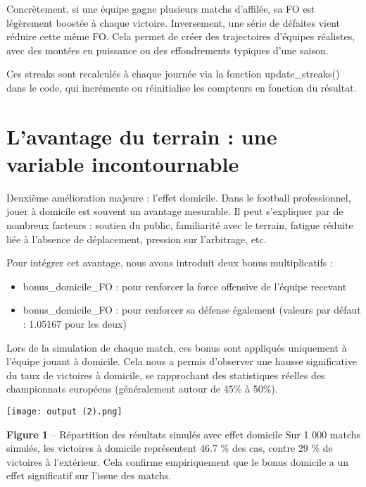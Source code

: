 \documentclass[12pt]{report}
\begin{document}
Concrètement, si une équipe gagne plusieurs matchs d’affilée, sa FO est légèrement boostée à chaque victoire. Inversement, une série de défaites vient réduire cette même FO. Cela permet de créer des trajectoires d’équipes réalistes, avec des montées en puissance ou des effondrements typiques d’une saison.

Ces streaks sont recalculés à chaque journée via la fonction update\_streaks() dans le code, qui incrémente ou réinitialise les compteurs en fonction du résultat.

\section{L’avantage du terrain : une variable incontournable}

Deuxième amélioration majeure : l’effet domicile. Dans le football professionnel, jouer à domicile est souvent un avantage mesurable. Il peut s’expliquer par de nombreux facteurs : soutien du public, familiarité avec le terrain, fatigue réduite liée à l’absence de déplacement, pression sur l’arbitrage, etc.

Pour intégrer cet avantage, nous avons introduit deux bonus multiplicatifs :
\begin{itemize}
  \item bonus\_domicile\_FO : pour renforcer la force offensive de l’équipe recevant
  \item bonus\_domicile\_FO : pour renforcer sa défense également (valeurs par défaut : 1.05167 pour les deux)\\
\end{itemize}

Lors de la simulation de chaque match, ces bonus sont appliqués uniquement à l’équipe jouant à domicile. Cela nous a permis d’observer une hausse significative du taux de victoires à domicile, se rapprochant des statistiques réelles des championnats européens (généralement autour de 45\% à 50\%).

\begin{tcolorbox}[
  colback=white, colframe=green!60!black,
  title=\textcolor{white}{\textbf{Répartition des scores simulés}},
  coltitle=white, colbacktitle=green!60!black,
  boxrule=0.8pt,
  left=4pt, right=4pt, top=5pt, bottom=5pt,
  boxsep=5pt,
  enhanced, sharp corners
]
\centering
\texttt{[image: output (2).png]}
\label{fig:graphemoha1}
\end{tcolorbox}


\textbf{Figure 1} – Répartition des résultats simulés avec effet domicile
Sur 1 000 matchs simulés, les victoires à domicile représentent 46.7 \% des cas, contre 29 \% de victoires à l’extérieur. Cela confirme empiriquement que le bonus domicile a un effet significatif sur l’issue des matchs.
\end{document}
